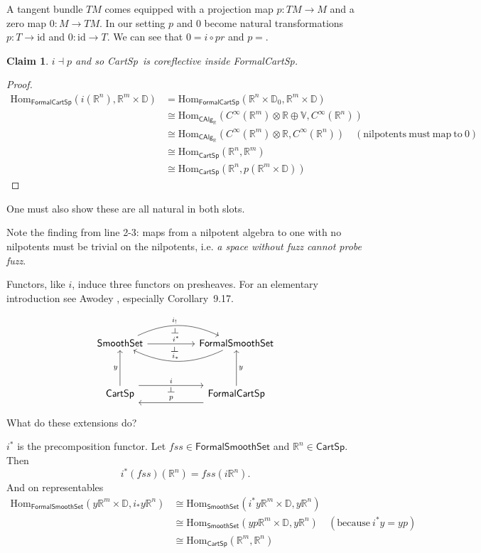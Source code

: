 \documentclass[12pt]{article}
\newcommand{\Hom}{\mathrm{Hom}}
\newcommand{\adj}{\dashv}
\newcommand{\id}{\ensuremath{\text{id}}}
\newcommand{\rr}{\ensuremath{\mathbb{R}}}
\newcommand{\rrn}{\ensuremath{\mathbb{R}^n}}
\newcommand{\rrm}{\ensuremath{\mathbb{R}^m}}
\newcommand{\dd}{\ensuremath{\mathbb{D}}}
\newcommand{\vv}{\ensuremath{\mathbb{V}}}
\newcommand{\cinfty}{\ensuremath{C^{\infty}}}
\newcommand{\calg}{\textsf{CAlg}_{\rr}}
\newcommand{\cart}{\textsf{CartSp}}
\newcommand{\formalcart}{\textsf{FormalCartSp}}
\newcommand{\formalsmoothset}{\textsf{FormalSmoothSet}}
\newcommand{\smoothset}{\textsf{SmoothSet}}
\newtheorem{myclaim}{Claim}
\begin{document}
A tangent bundle $TM$ comes equipped with a projection map $p:TM\to M$ and a zero map $0:M\to TM$. In our setting $p$ and $0$ become natural transformations $p:T\to\id$ and $0:\id\to T$. We can see that $0=i\circ pr$ and $p=$.

\begin{myclaim}$i\adj p$ and so \cart\ is coreflective inside \formalcart.\end{myclaim}

\begin{proof}
\begin{align*}
\Hom_{\formalcart}(i(\rrn), \rrm\times\dd) &= \Hom_{\formalcart}(\rrn\times\dd_0, \rrm\times\dd) \\
&\cong \Hom_{\calg}(\cinfty(\rrm)\otimes\rr\oplus\vv, \cinfty(\rrn)) \\
&\cong \Hom_{\calg}(\cinfty(\rrm)\otimes\rr, \cinfty(\rrn))\quad\mathrm{(nilpotents\ must\ map\ to\ 0)} \\
&\cong \Hom_{\cart}(\rrn, \rrm) \\
&\cong \Hom_{\cart}(\rrn, p(\rrm\times\dd))
\end{align*}
\end{proof}
One must also show these are all natural in both slots.

Note the finding from line 2-3: maps from a nilpotent algebra to one with no nilpotents must be trivial on the nilpotents, i.e. \emph{a space without fuzz cannot probe fuzz}.

Functors, like $i$, induce three functors on presheaves. For an elementary introduction see Awodey \cite{awodey_introduction_2010}, especially Corollary~9.17.

$$
\begin{tikzcd}[row sep=huge, column sep=huge]
\smoothset \arrow[r, "\mkern-16mu i_!"{name=F}, bend left=25]
\arrow[r, "\quad i^*"{name=G}]
\arrow[phantom, from=F, to=G, "\ \dashv" rotate=-90]
& \formalsmoothset \arrow[l, "\mkern-12mu i_*"{name=H}, swap, bend left=25]
\arrow[phantom, from=G, to=H, "\ \dashv" rotate=-90] \\
\cart \arrow[u, "y"] \arrow[r, "i"{name=I}, shift left=2.0ex]
& \formalcart \arrow[l, "p"{name=P}, shift left=2.0ex, swap]
\arrow[u, "y", swap]
\arrow[phantom, from=I, to=P, "\dashv" rotate=-90]
\end{tikzcd}
$$

What do these extensions do?

$i^*$ is the precomposition functor. Let $fss\in\formalsmoothset$ and $\rrn\in\cart$. Then $$i^*(fss)(\rrn)=fss(i\rrn).$$ And on representables
\begin{align*}
\Hom_{\formalsmoothset}(y\rrm\times\dd, i_*y\rrn) &\cong \Hom_{\smoothset}(i^*y\rrm\times\dd, y\rrn) \\
&\cong \Hom_{\smoothset} (yp\rrm\times\dd, y\rrn)\quad(\mathrm{because\ }i^*y=yp)\\
&\cong \Hom_{\cart} (\rrm, \rrn)
\end{align*}
\end{document}
